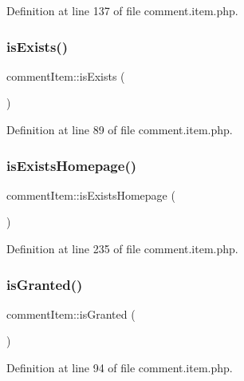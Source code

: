 Definition at line 137 of file comment.\+item.\+php.

\mbox{\label{classcommentItem_a994914aab465cd8b950bd05e655afb9f}} 
\subsubsection{\texorpdfstring{is\+Exists()}{isExists()}}
{\footnotesize\ttfamily comment\+Item\+::is\+Exists (\begin{DoxyParamCaption}{ }\end{DoxyParamCaption})}



Definition at line 89 of file comment.\+item.\+php.

\mbox{\label{classcommentItem_a77da9a1df41b15e776ef22ca2d648aa1}} 
\subsubsection{\texorpdfstring{is\+Exists\+Homepage()}{isExistsHomepage()}}
{\footnotesize\ttfamily comment\+Item\+::is\+Exists\+Homepage (\begin{DoxyParamCaption}{ }\end{DoxyParamCaption})}



Definition at line 235 of file comment.\+item.\+php.

\mbox{\label{classcommentItem_aa614277cd1369df7b0446e0cffd65c6d}} 
\subsubsection{\texorpdfstring{is\+Granted()}{isGranted()}}
{\footnotesize\ttfamily comment\+Item\+::is\+Granted (\begin{DoxyParamCaption}{ }\end{DoxyParamCaption})}



Definition at line 94 of file comment.\+item.\+php.

